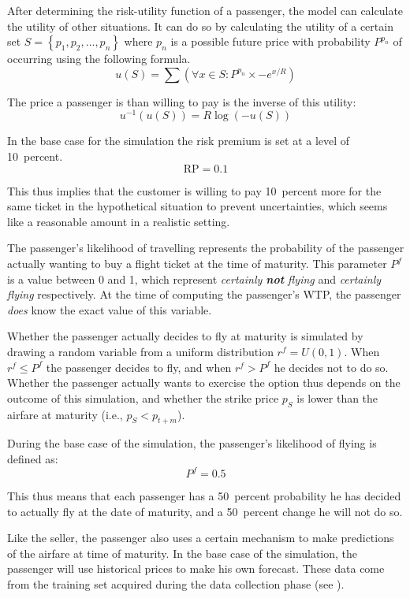 After determining the risk-utility function of a passenger, the model can calculate the utility of other situations. It can do so by calculating the utility of a certain set $S = \left\{ p_1, p_2, \ldots, p_n\right\}$ where $p_n$ is a possible future price with probability $P^{p_n}$ of occurring using the following formula.
$$
u(S) = \sum (\forall x \in S: P^{p_n} \times -e^{x/R})
$$

The price a passenger is than willing to pay is the inverse of this utility:
$$
u^{-1}(u(S)) = R \log(-u(S))
$$

In the base case for the simulation the risk premium is set at a level of 10~percent. 
$$\mbox{RP} = 0.1$$

This thus implies that the customer is willing to pay 10~percent more for the same ticket in the hypothetical situation to prevent uncertainties, which seems like a reasonable amount in a realistic setting.


The passenger's likelihood of travelling represents the probability of the passenger actually wanting to buy a flight ticket at the time of maturity. This parameter $P^f$ is a value between 0 and 1, which represent \emph{certainly \textbf{not} flying} and \emph{certainly flying} respectively. At the time of computing the passenger's WTP, the passenger \emph{does} know the exact value of this variable.

Whether the passenger actually decides to fly at maturity is simulated by drawing a random variable from a uniform distribution $r^f = U(0,1)$. When $r^f \le P^f$ the passenger decides to fly, and when $r^f > P^f$ he decides not to do so. Whether the passenger actually wants to exercise the option thus depends on the outcome of this simulation, and whether the strike price $p_S$ is lower than the airfare at maturity (i.e., $p_S < p_{t+m}$).

During the base case of the simulation, the passenger's likelihood of flying is defined as:
$$P^f = 0.5$$

This thus means that each passenger has a 50~percent probability he has decided to actually fly at the date of maturity, and a 50~percent change he will not do so.


Like the seller, the passenger also uses a certain mechanism to make predictions of the airfare at time of maturity. In the base case of the simulation, the passenger will use historical prices to make his own forecast. These data come from the training set acquired during the data collection phase (see ).

